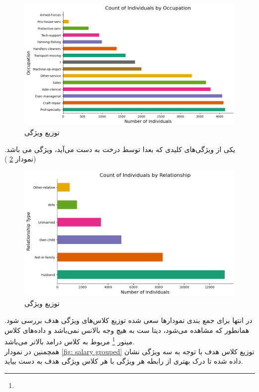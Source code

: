 \documentclass{article}
\begin{document}
	\begin{figure}[H]
		\centering
		\includegraphics[scale=0.5]{figs/occupation_dist}
		\caption{
			توزیع ویژگی 
		}
		\label{fig: occ dist}
	\end{figure}
	یکی از ویژگی‌های کلیدی که بعدا توسط درخت به دست می‌آید، ویژگی 
	می باشد.(نمودار 
	\ref{fig: relationship dist}
	)
	\begin{figure}[H]
		\centering
		\includegraphics[scale=0.5]{figs/relationship_dist}
		\caption{
			توزیع ویژگی 
		}
		\label{fig: relationship dist}
	\end{figure}
	در انتها برای جمع بندی نمودارها سعی شده توزیع کلاس‌های ویژگی هدف بررسی شود. همانطور که مشاهده می‌شود، دیتا ست به هیچ وجه بالانس نمی‌باشد و داده‌های کلاس ‌مینور
	\footnote{}
	مربوط به کلاس درامد بالاتر می‌باشد.\\
	همچمنین در نمودار
	\ref{fig: salary grouped}
	توزیع کلاس هدف با توجه به سه ویژگی نشان داده شده تا درک بهتری از رابطه هر ویژگی با هر کلاس ویژگی هدف به دست بیاید.
	
\end{document}
